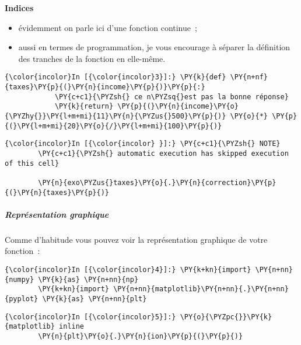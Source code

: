     \textbf{Indices}

\begin{itemize}
\tightlist
\item
  évidemment on parle ici d'une fonction continue~;
\item
  aussi en termes de programmation, je vous encourage à séparer la
  définition des tranches de la fonction en elle-même.
\end{itemize}

    \begin{Verbatim}[commandchars=\\\{\}]
{\color{incolor}In [{\color{incolor}3}]:} \PY{k}{def} \PY{n+nf}{taxes}\PY{p}{(}\PY{n}{income}\PY{p}{)}\PY{p}{:}
            \PY{c+c1}{\PYZsh{} ce n\PYZsq{}est pas la bonne réponse}
            \PY{k}{return} \PY{p}{(}\PY{n}{income}\PY{o}{\PYZhy{}}\PY{l+m+mi}{11}\PY{n}{\PYZus{}500}\PY{p}{)} \PY{o}{*} \PY{p}{(}\PY{l+m+mi}{20}\PY{o}{/}\PY{l+m+mi}{100}\PY{p}{)}
\end{Verbatim}


    \begin{Verbatim}[commandchars=\\\{\}]
{\color{incolor}In [{\color{incolor} }]:} \PY{c+c1}{\PYZsh{} NOTE}
        \PY{c+c1}{\PYZsh{} automatic execution has skipped execution of this cell}
        
        \PY{n}{exo\PYZus{}taxes}\PY{o}{.}\PY{n}{correction}\PY{p}{(}\PY{n}{taxes}\PY{p}{)}
\end{Verbatim}


    \hypertarget{repruxe9sentation-graphique}{%
\subparagraph{Représentation
graphique}\label{repruxe9sentation-graphique}}

    Comme d'habitude vous pouvez voir la représentation graphique de votre
fonction~:

    \begin{Verbatim}[commandchars=\\\{\}]
{\color{incolor}In [{\color{incolor}4}]:} \PY{k+kn}{import} \PY{n+nn}{numpy} \PY{k}{as} \PY{n+nn}{np}
        \PY{k+kn}{import} \PY{n+nn}{matplotlib}\PY{n+nn}{.}\PY{n+nn}{pyplot} \PY{k}{as} \PY{n+nn}{plt}
\end{Verbatim}


    \begin{Verbatim}[commandchars=\\\{\}]
{\color{incolor}In [{\color{incolor}5}]:} \PY{o}{\PYZpc{}}\PY{k}{matplotlib} inline
        \PY{n}{plt}\PY{o}{.}\PY{n}{ion}\PY{p}{(}\PY{p}{)}
\end{Verbatim}


